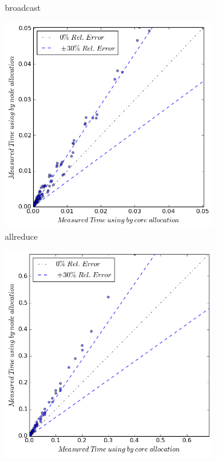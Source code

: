 \begin{figure}[ht]
\begin{subfigure}[b]{0.40\textwidth}
        \caption{broadcast}
    \end{subfigure}
     \quad
    \begin{subfigure}[b]{0.40\textwidth}
        \includegraphics[width=\textwidth]{./images/bycore_vs_bynode/allreduce.png}
        \caption{allreduce}
    \end{subfigure}
    \quad 
     \begin{subfigure}[b]{0.40\textwidth}
        \includegraphics[width=\textwidth]{./images/bycore_vs_bynode/allgather.png}

\end{subfigure}
\end{figure}
